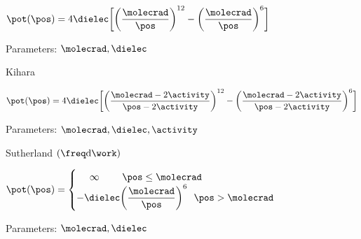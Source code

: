 \begin{bigmdframed}
\begin{listone}
    \item {}
    
    \begin{listtwo}
        
    	\item $\pot(\pos) = 4\dielec\bigg[\bigg(\dfrac{\molecrad}{\pos}\bigg)^{12}-\bigg(\dfrac{\molecrad}{\pos}\bigg)^6\bigg] $
    
    	\item Parameters: $\molecrad, \dielec$
    
    \end{listtwo}
    
    \item Kihara
    
    \begin{listtwo}
    
    	\item $\pot(\pos) = 4\dielec\bigg[\bigg(\dfrac{\molecrad-2\activity}{\pos-2\activity}\bigg)^{12}-\bigg(\dfrac{\molecrad-2\activity}{\pos-2\activity}\bigg)^6\bigg] $
    
    	\item Parameters: $\molecrad, \dielec, \activity$
    
    \end{listtwo}
    
    \item Sutherland $(\freq \mathrm{d}\work)$
    
    \begin{listtwo}
    
    	\item $\pot(\pos)=\begin{cases}
                    ~~~~\infty ~~~~~~~ \pos \leq \molecrad\\
                    -\dielec\bigg(\dfrac{\molecrad}{\pos}\bigg)^6 ~~ \pos > \molecrad\\
                \end{cases}$
                
    	\item Parameters: $\molecrad, \dielec$
    
    \end{listtwo}
    
\end{listone}

\end{bigmdframed}
